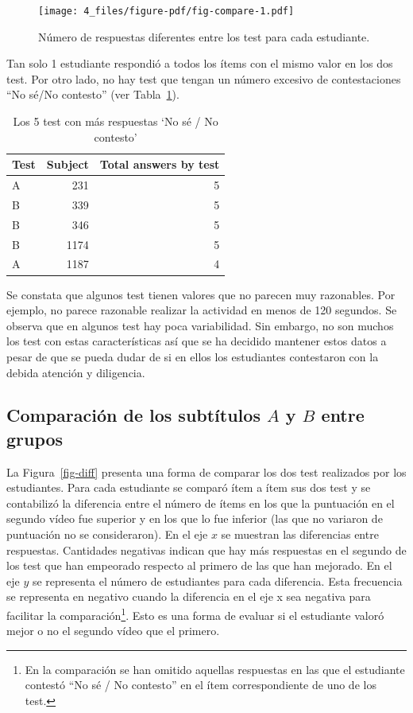 \documentclass[
  12pt,
  a4paper,
  extrafontsizes,
  onecolumn,
  openright,
  table]{memoir}
\begin{document}
\begin{figure}[h]

{\centering \texttt{[image: 4\_files/figure-pdf/fig-compare-1.pdf]}

}

\caption{\label{fig-compare}Número de respuestas diferentes entre los
test para cada estudiante.}

\end{figure}

Tan solo 1 estudiante respondió a todos los ítems con el mismo valor en
los dos test. Por otro lado, no hay test que tengan un número excesivo
de contestaciones \enquote{No sé/No contesto} (ver
Tabla~\ref{tbl-noanswer}).

\hypertarget{tbl-noanswer}{}
\begin{longtable}{lrr}
\caption{\label{tbl-noanswer}Los 5 test con más respuestas `No sé / No contesto' }\tabularnewline

\toprule
Test & Subject & Total answers by test \\ 
\midrule
A & 231 & 5 \\ 
B & 339 & 5 \\ 
B & 346 & 5 \\ 
B & 1174 & 5 \\ 
A & 1187 & 4 \\ 
\bottomrule
\end{longtable}

Se constata que algunos test tienen valores que no parecen muy
razonables. Por ejemplo, no parece razonable realizar la actividad en
menos de 120 segundos. Se observa que en algunos test hay poca
variabilidad. Sin embargo, no son muchos los test con estas
características así que se ha decidido mantener estos datos a pesar de
que se pueda dudar de si en ellos los estudiantes contestaron con la
debida atención y diligencia.

\hypertarget{sec-eda-3}{%
\subsection{\texorpdfstring{Comparación de los subtítulos \(A\) y \(B\)
entre
grupos}{Comparación de los subtítulos A y B entre grupos}}\label{sec-eda-3}}

La Figura~\ref{fig-diff} presenta una forma de comparar los dos test
realizados por los estudiantes. Para cada estudiante se comparó ítem a
ítem sus dos test y se contabilizó la diferencia entre el número de
ítems en los que la puntuación en el segundo vídeo fue superior y en los
que lo fue inferior (las que no variaron de puntuación no se
consideraron). En el eje \(x\) se muestran las diferencias entre
respuestas. Cantidades negativas indican que hay más respuestas en el
segundo de los test que han empeorado respecto al primero de las que han
mejorado. En el eje \(y\) se representa el número de estudiantes para
cada diferencia. Esta frecuencia se representa en negativo cuando la
diferencia en el eje x sea negativa para facilitar la
comparación\footnote{En la comparación se han omitido aquellas
  respuestas en las que el estudiante contestó \enquote{No sé / No
  contesto} en el ítem correspondiente de uno de los test.}. Esto es una
forma de evaluar si el estudiante valoró mejor o no el segundo vídeo que
el primero.
\end{document}
